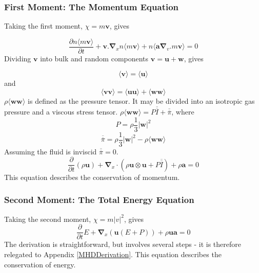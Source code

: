 \subsubsection{First Moment: The Momentum Equation}
Taking the first moment, $\chi = m \mathbf{v} $, gives 

\begin{equation}
\frac{\partial{ n \langle m \mathbf{v} \rangle }}{\partial{t}}
+
\mathbf{v}. {\boldsymbol{\nabla}}_x n{\langle m \mathbf{v} \rangle}
+
n
\langle
\mathbf{a} 
{\boldsymbol{\nabla}}_v . { m \mathbf{v} }
\rangle
=0
\end{equation}
Dividing $\mathbf{v}$ into bulk and random components $\mathbf{v=u+w}$,
gives 

\begin{equation}
\langle \mathbf{v} \rangle= \langle \mathbf{u} \rangle
\end{equation}
and 
\begin{equation}
\langle \mathbf{v v} \rangle= \langle \mathbf{u u} \rangle + \langle \mathbf{w w} \rangle
\end{equation}
$ \rho\langle \mathbf{w w} \rangle$ is defined as the pressure tensor. It may be divided into an isotropic gas pressure and a viscous stress tensor.
$ \rho \langle \mathbf{w w} \rangle = P{\overline{ \overline I} } + {\overline { \overline \pi}} $,
where 
\begin{equation}
P = \rho \frac{1}{3} {\left| \mathbf{w} \right|}^2
\end{equation}
\begin{equation}
{\overline {\overline \pi}} = \rho \frac{1}{3} {\left| \mathbf{w} \right|}^2 - \rho \langle \mathbf{w w} \rangle
\end{equation}
Assuming the fluid is inviscid ${\overline {\overline \pi}}=0$.
\begin{equation}
\frac{\partial}{\partial t}\left(
\rho \mathbf u
\right)
+ {\boldsymbol{\nabla}}_x
\cdot
\left( 
\rho 
\mathbf {u} \otimes \mathbf{u} 
+
P{\overline{ \overline I} }
\right)
+ \rho \mathbf{a}
=0
\end{equation}
This equation describes the conservation of momentum.

\subsubsection{Second Moment: The Total Energy Equation}

Taking the second moment, $\chi = m {\left|v\right|}^2 $, gives 
\begin{equation}
\frac{\partial}{\partial t}E
+
{\boldsymbol{\nabla}}_x 
\left( 
\mathbf{u} \left( E +P \right)
\right)
+
\rho \mathbf{u} \mathbf{a}
=0
\end{equation}
The derivation is straightforward, but involves several steps - it is therefore relegated to Appendix \ref{MHDDerivation}.
This equation describes the conservation of energy.

